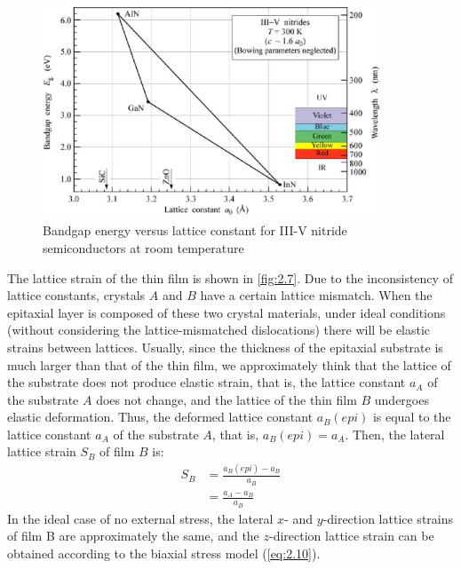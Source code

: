 \begin{figure}[H] 
\centering    
\includegraphics[width=0.9\textwidth]{ch2_6}
\caption[Bandgap energy versus lattice constant for III-V nitride semiconductors at room temperature
]{Bandgap energy versus lattice constant for III-V nitride semiconductors at room temperature}
\label{fig:2.6}
\end{figure}

The lattice strain  of the  thin film is shown in \autoref{fig:2.7}. Due to the inconsistency of  lattice constants, crystals $A$ and $B$ have  a certain lattice  mismatch. When the epitaxial layer  is composed of these two crystal materials, under ideal conditions (without considering the lattice-mismatched dislocations) there will be elastic strains  between lattices. Usually, since the thickness of the epitaxial substrate is much larger than that of the  thin film, we approximately think that the lattice of the substrate  does not produce  elastic strain, that is, the  lattice constant $a_{A}$ of the substrate $A$ does not change, and the lattice of the thin film $B$ undergoes  elastic  deformation. Thus, the deformed lattice constant  $a_{B}(epi)$ is equal to the lattice constant $a_{A}$ of the substrate $A$, that is, $a_{B}(epi)=a_{A}$. Then, the lateral lattice  strain $S_{B}$ of film $B$ is:
\begin{equation}
\begin{aligned}
S_{B} &=\frac{a_{B}(e p i)-a_{B}}{a_{B}} \\
&=\frac{a_{A}-a_{B}}{a_{B}}
\end{aligned}
\label{eq:2.12}
\end{equation}
In the ideal case of no external stress, the lateral $x$- and $y$-direction lattice strains  of film B are approximately the same, and the $z$-direction lattice strain  can be obtained according to the biaxial stress model  (\autoref{eq:2.10}).

